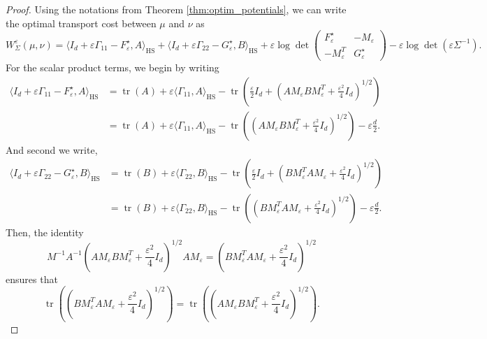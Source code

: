 \documentclass[10pt,a4paper]{amsart}
\DeclareMathOperator{\HS}{HS}
\DeclareMathOperator{\tr}{tr}
\begin{document}
\begin{proof}
	Using the notations from Theorem \ref{thm:optim_potentials}, we can write the optimal transport cost between $\mu$ and $\nu$ as
	\begin{equation*}
		W_\Sigma^{\varepsilon}(\mu, \nu) = \langle I_d+\varepsilon \Gamma_{11} - F_{\varepsilon}^{\star}, A \rangle_{\HS} + \langle I_d + \varepsilon \Gamma_{22} - G_\varepsilon^{\star}, B \rangle_{\HS} + \varepsilon \log \det \begin{pmatrix}
			F_\varepsilon^{\star}  & -M_{\varepsilon}    \\
			-M_{\varepsilon}^T&    G_\varepsilon^{\star}
		\end{pmatrix} - \varepsilon \log \det(\varepsilon \Sigma^{-1}).
	\end{equation*}
	For the scalar product terms, we begin by writing 
	\begin{align*}
		\langle I_d +\varepsilon \Gamma_{11} - F_{\varepsilon}^{\star}, A \rangle_{\HS} & = \tr(A) + \varepsilon \langle \Gamma_{11}, A \rangle_{\HS} - \tr\left(\frac{\varepsilon}{2}I_d+ \left(AM_{\varepsilon}BM_{\varepsilon}^T+ \frac{\varepsilon^2}{4}I_d \right)^{1/2} \right) \\
		&  =  \tr(A) + \varepsilon \langle \Gamma_{11}, A \rangle_{\HS} - \tr\left( \left(AM_{\varepsilon}BM_{\varepsilon}^T+ \frac{\varepsilon^2}{4}I_d \right)^{1/2} \right) - \varepsilon \frac{d}{2}.
	\end{align*}
	And second we write, 
	\begin{align*}
		\langle I_d+\varepsilon \Gamma_{22}- G_{\varepsilon}^{\star}, B \rangle_{\HS} & = \tr(B) + \varepsilon \langle \Gamma_{22}, B \rangle_{\HS} - \tr\left(\frac{\varepsilon}{2}I_d +\left(BM_{\varepsilon}^T AM_{\varepsilon}+ \frac{\varepsilon^2}{4}I_d \right)^{1/2} \right) \\
		& = \tr(B) + \varepsilon \langle \Gamma_{22}, B \rangle_{\HS} - \tr\left(\left(BM_\varepsilon^T AM_{\varepsilon}+ \frac{\varepsilon^2}{4}I_d \right)^{1/2} \right) - \varepsilon \frac{d}{2}.
	\end{align*}
	Then, the identity
	\begin{equation*}
		M^{-1}A^{-1}\left(AM_{\varepsilon}BM_{\varepsilon}^T+ \frac{\varepsilon^2}{4}I_d  \right)^{1/2} AM_{\varepsilon}=\left(BM_{\varepsilon}^T AM_{\varepsilon}+ \frac{\varepsilon^2}{4}I_d  \right)^{1/2}
	\end{equation*}
	ensures that 
	\begin{equation*}
		\tr\left(\left(BM_{\varepsilon}^T AM_{\varepsilon}+ \frac{\varepsilon^2}{4}I_d \right)^{1/2} \right) = \tr\left(\left(AM_{\varepsilon}BM_{\varepsilon}^T+ \frac{\varepsilon^2}{4}I_d \right)^{1/2} \right).

\end{equation*}
\end{proof}
\end{document}
